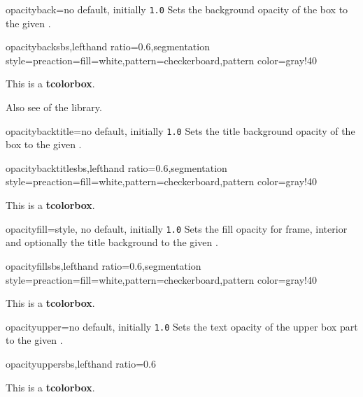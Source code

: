 \begin{docTcbKey}{opacityback}{=}{no default, initially \texttt{1.0}}
  Sets the background opacity of the box to the given .
\begin{exdispExample*}{opacityback}{sbs,lefthand ratio=0.6,segmentation style={preaction={fill=white},pattern=checkerboard,pattern color=gray!40}}
\begin{tcolorbox}[standard jigsaw,colframe=red,
  opacityframe=0.5, opacityback=0.5]
This is a \textbf{tcolorbox}.
\end{tcolorbox}
\end{exdispExample*}
\end{docTcbKey}

Also see  of the  library.

\begin{docTcbKey}{opacitybacktitle}{=}{no default, initially \texttt{1.0}}
  Sets the title background opacity of the box to the given .
\begin{exdispExample*}{opacitybacktitle}{sbs,lefthand ratio=0.6,segmentation style={preaction={fill=white},pattern=checkerboard,pattern color=gray!40}}
\begin{tcolorbox}[standard jigsaw,colframe=red,
  opacityframe=0.5, opacitybacktitle=0.5,
  title filled, title=This is a title]
This is a \textbf{tcolorbox}.
\end{tcolorbox}
\end{exdispExample*}
\end{docTcbKey}


\begin{docTcbKey}{opacityfill}{=}{style, no default, initially \texttt{1.0}}
  Sets the fill opacity for frame, interior and optionally the title background
  to the given .
\begin{exdispExample*}{opacityfill}{sbs,lefthand ratio=0.6,segmentation style={preaction={fill=white},pattern=checkerboard,pattern color=gray!40}}
\begin{tcolorbox}[standard jigsaw,colframe=red,
  opacityfill=0.7, title=This is a title]
This is a \textbf{tcolorbox}.
\end{tcolorbox}
\end{exdispExample*}
\end{docTcbKey}

\clearpage
\begin{docTcbKey}{opacityupper}{=}{no default, initially \texttt{1.0}}
  Sets the text opacity of the upper box part to the given .
\begin{exdispExample*}{opacityupper}{sbs,lefthand ratio=0.6}
\begin{tcolorbox}[enhanced,opacityupper=0.5,
  interior style={preaction={fill=white},pattern=checkerboard,pattern color=gray!40}]
This is a \textbf{tcolorbox}.
\end{tcolorbox}
\end{exdispExample*}
\end{docTcbKey}



